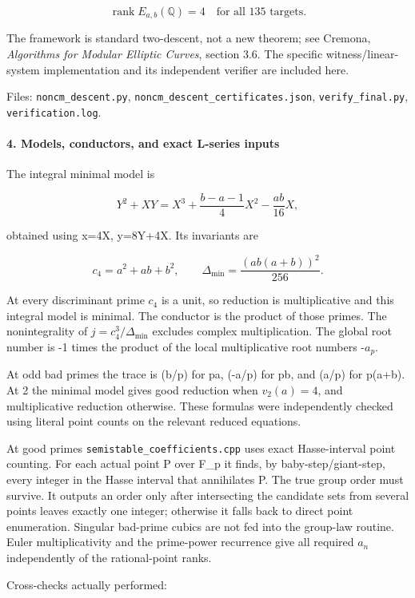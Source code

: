 \documentclass[11pt]{article}
\begin{document}
\[
\operatorname{rank}E_{a,b}(\mathbb Q)=4\quad\text{for all 135 targets.}
\]

The framework is standard two-descent, not a new theorem; see Cremona, \emph{Algorithms for Modular Elliptic Curves}, section 3.6. The specific witness/linear-system implementation and its independent verifier are included here.

Files: \nolinkurl{noncm_descent.py}, \nolinkurl{noncm_descent_certificates.json}, \nolinkurl{verify_final.py}, \nolinkurl{verification.log}.

\paragraph{4. Models, conductors, and exact L-series inputs}

The integral minimal model is

\[
Y^2+XY=X^3+\frac{b-a-1}{4}X^2-\frac{ab}{16}X,
\]

obtained using x=4X, y=8Y+4X. Its invariants are

\[
c_4=a^2+ab+b^2,\qquad \Delta_{\min}=\frac{(ab(a+b))^2}{256}.
\]

At every discriminant prime \(c_4\) is a unit, so reduction is multiplicative and this integral model is minimal. The conductor is the product of those primes. The nonintegrality of \(j=c_4^3/\Delta_{\min}\) excludes complex multiplication. The global root number is -1 times the product of the local multiplicative root numbers -\(a_p\).

At odd bad primes the trace is (b/p) for p\textbar a, (-a/p) for p\textbar b, and (a/p) for p\textbar(a+b). At 2 the minimal model gives good reduction when \(v_2(a)=4\), and multiplicative reduction otherwise. These formulas were independently checked using literal point counts on the relevant reduced equations.

At good primes \nolinkurl{semistable_coefficients.cpp} uses exact Hasse-interval point counting. For each actual point P over F\_p it finds, by baby-step/giant-step, every integer in the Hasse interval that annihilates P. The true group order must survive. It outputs an order only after intersecting the candidate sets from several points leaves exactly one integer; otherwise it falls back to direct point enumeration. Singular bad-prime cubics are not fed into the group-law routine. Euler multiplicativity and the prime-power recurrence give all required \(a_n\) independently of the rational-point ranks.

Cross-checks actually performed:
\end{document}
